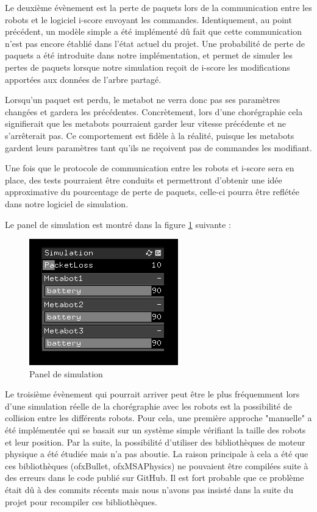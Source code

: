 Le deuxième évènement est la perte de paquets lors de la communication entre les robots et le logiciel i-score envoyant les commandes. Identiquement, au point précédent, un modèle simple a été implémenté dû fait que cette communication n'est pas encore établié dans l'état actuel du projet. Une probabilité de perte de paquets a été introduite dans notre implémentation, et permet de simuler les pertes de paquets lorsque notre simulation reçoit de i-score les modifications apportées aux données de l'arbre partagé. 

Lorsqu'un paquet est perdu, le metabot ne verra donc pas ses paramètres changées et gardera les précédentes. Concrètement, lors d'une chorégraphie cela signifierait que les metabots pourraient garder leur vitesse précédente et ne s'arrêterait pas. Ce comportement est fidèle à la réalité, puisque les metabots gardent leurs paramètres tant qu'ils ne reçoivent pas de commandes les modifiant. 

Une fois que le protocole de communication entre les robots et i-score sera en place, des tests pourraient être conduits et permettront d'obtenir une idée approximative du pourcentage de perte de paquets, celle-ci pourra être reflétée dans notre logiciel de simulation.

Le panel de simulation est montré dans la figure \ref{spa} suivante :

\begin{figure}[H]
\centering
\includegraphics[scale=1]{imgs/spanel}
\caption{Panel de simulation}
\label{spa}
\end{figure} 

Le troisième évènement qui pourrait arriver peut être le plus fréquemment lors d'une simulation réelle de la chorégraphie avec les robots est la possibilité de collision entre les différents robots. Pour cela, une première approche "manuelle" a été implémentée qui se basait sur un système simple vérifiant la taille des robots et leur position. Par la suite, la possibilité d'utiliser des bibliothèques de moteur physique a été étudiée mais n'a pas aboutie. La raison principale à cela a été que ces bibliothèques (ofxBullet, ofxMSAPhysics) ne pouvaient être compilées suite à des erreurs dans le code publié sur GitHub. Il est fort probable que ce problème était dû à des commits récents mais nous n'avons pas insisté dans la suite du projet pour recompiler ces bibliothèques. 

